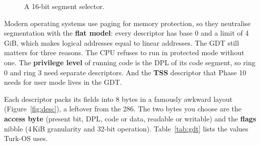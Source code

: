 \documentclass[11pt,a4paper]{article}
\begin{document}
\begin{figure}[htbp]
\centering
{}
\caption{A 16-bit segment selector.}
\label{fig:selector}
\end{figure}

Modern operating systems use paging for memory protection, so they neutralise segmentation with the \textbf{flat
model}: every descriptor has base 0 and a limit of 4\,GiB, which makes logical addresses equal to linear addresses.
The GDT still matters for three reasons. The CPU refuses to run in protected mode without one. The \textbf{privilege
level} of running code is the DPL of its code segment, so ring 0 and ring 3 need separate descriptors. And the
\textbf{TSS} descriptor that Phase 10 needs for user mode lives in the GDT.

Each descriptor packs its fields into 8 bytes in a famously awkward layout (Figure~\ref{fig:desc}), a leftover from
the 286. The two bytes you choose are the \textbf{access byte} (present bit, DPL, code or data, readable or writable)
and the \textbf{flags} nibble (4\,KiB granularity and 32-bit operation). Table~\ref{tab:gdt} lists the values
Turk-OS uses.
\end{document}
